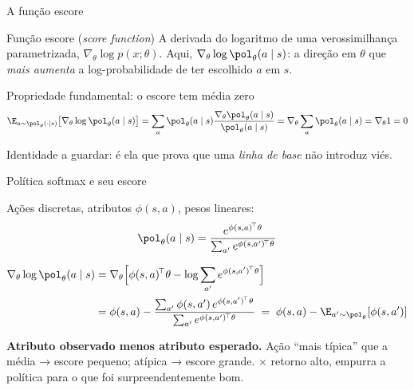 \documentclass[aspectratio=169, 11pt]{beamer}
\newcommand{\thv}{\theta}                       %
\newcommand{\polth}{\pol_{\thv}}                %
\newcommand{\gth}{\nabla_{\thv}}                %
\newcommand{\feat}{\phi}                        %
\newcommand{\gscore}{\gth \log \polth(a \mid s)} %
\begin{document}
\begin{frame}{A função escore}

  \begin{defbox}{Função escore \textnormal{(\emph{score function})}}
    A derivada do logaritmo de uma verossimilhança parametrizada,
    $\gth \log p(x;\thv)$. Aqui, $\gscore$: a direção em $\thv$ que
    \emph{mais aumenta} a log-probabilidade de ter escolhido $a$ em $s$.
  \end{defbox}

  \begin{teobox}{Propriedade fundamental: o escore tem média zero}
    \vspace{-0.9em}
    \[
      \E_{a\sim\polth(\cdot\mid s)}\bigl[\gscore\bigr]
      = \sum_a \polth(a\mid s)\frac{\gth\polth(a\mid s)}{\polth(a\mid s)}
      = \gth \sum_a \polth(a\mid s) = \gth 1 = 0
    \]
    \vspace{-0.9em}

    Identidade a guardar: é ela que prova que uma \emph{linha de base} não
    introduz viés.
  \end{teobox}
\end{frame}

\begin{frame}{Política softmax e seu escore}

  Ações discretas, atributos $\feat(s,a)$, pesos lineares:
  \[
    \polth(a \mid s) = \frac{e^{\feat(s,a)^{\!\top}\thv}}
                            {\sum_{a'} e^{\feat(s,a')^{\!\top}\thv}}
  \]

  {\small
  \begin{align*}
    \gscore
      &= \gth\Bigl[\feat(s,a)^{\!\top}\thv - \log \sum_{a'} e^{\feat(s,a')^{\!\top}\thv}\Bigr] \\
      &= \feat(s,a) - \frac{\sum_{a'} \feat(s,a')\, e^{\feat(s,a')^{\!\top}\thv}}
                            {\sum_{a'} e^{\feat(s,a')^{\!\top}\thv}}
       \;=\; \feat(s,a) - \E_{a'\sim\polth}[\feat(s,a')]
  \end{align*}}

  \begin{ideiabox}
    \textbf{Atributo observado menos atributo esperado.} Ação ``mais típica''
    que a média → escore pequeno; atípica → escore grande. × retorno alto,
    empurra a política para o que foi surpreendentemente bom.
  \end{ideiabox}
\end{frame}
\end{document}
